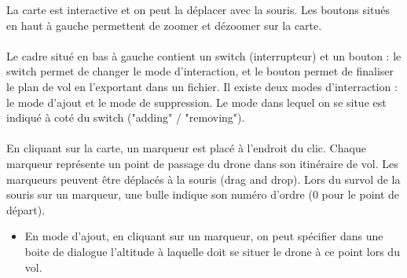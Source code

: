 \documentclass{article}
\begin{document}
\begin{enumerate}
 	La carte est interactive et on peut la déplacer avec la souris.
  Les boutons situés en haut à gauche permettent de zoomer et dézoomer sur la carte.\\ \\
 Le cadre situé en bas à gauche contient un switch (interrupteur) et un bouton : le switch permet de changer le mode d'interaction, et le bouton permet de finaliser le plan de vol en l'exportant dans un fichier.
 Il existe deux modes d'interraction :  le mode d'ajout et le mode de suppression. Le mode dans lequel on se situe est indiqué à coté du switch ("adding" / "removing").\\ \\
  En cliquant sur la carte, un marqueur est placé à l'endroit du clic. Chaque marqueur représente un point de passage du drone dans son itinéraire de vol. Les marqueurs peuvent être déplacés à la souris (drag and drop). Lors du survol de la souris sur un marqueur, une bulle indique son numéro d'ordre (0 pour le point de départ).\\
  	\begin{itemize}
 	\item En mode d'ajout, en cliquant sur un marqueur, on peut spécifier dans une boite de dialogue l'altitude à laquelle doit se situer le drone à ce point lors du vol.\\


\end{itemize}
\end{enumerate}
\end{document}
